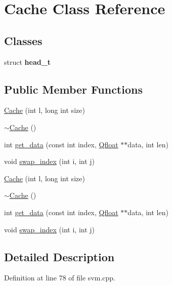 \hypertarget{class_cache}{\section{Cache Class Reference}
\label{class_cache}
}
\subsection*{Classes}
\begin{DoxyCompactItemize}
\item 
struct {\bfseries head\-\_\-t}
\end{DoxyCompactItemize}
\subsection*{Public Member Functions}
\begin{DoxyCompactItemize}
\item 
\hyperlink{class_cache_a2823f543d4f9b92c29472b904961afe1}{Cache} (int l, long int size)
\item 
\hyperlink{class_cache_af8b171a6c49d88d3ba179477484b9d48}{$\sim$\-Cache} ()
\item 
int \hyperlink{class_cache_aca49263fb34641e208884cc223b25317}{get\-\_\-data} (const int index, \hyperlink{svm_8cpp_a8755d90a54ecfb8d15051af3e0542592}{Qfloat} $\ast$$\ast$data, int len)
\item 
void \hyperlink{class_cache_aaff2dc955f9492c044c98a5f09cfddcc}{swap\-\_\-index} (int i, int j)
\item 
\hyperlink{class_cache_a2823f543d4f9b92c29472b904961afe1}{Cache} (int l, long int size)
\item 
\hyperlink{class_cache_af8b171a6c49d88d3ba179477484b9d48}{$\sim$\-Cache} ()
\item 
int \hyperlink{class_cache_aca49263fb34641e208884cc223b25317}{get\-\_\-data} (const int index, \hyperlink{svm_8cpp_a8755d90a54ecfb8d15051af3e0542592}{Qfloat} $\ast$$\ast$data, int len)
\item 
void \hyperlink{class_cache_aaff2dc955f9492c044c98a5f09cfddcc}{swap\-\_\-index} (int i, int j)
\end{DoxyCompactItemize}


\subsection{Detailed Description}


Definition at line 78 of file svm.\-cpp.



